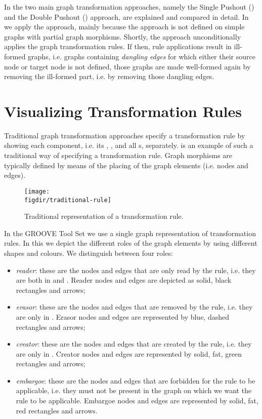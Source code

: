 In \cite{GG-Handbook-I} the two main graph transformation approaches, namely the Single Pushout (\spo) and the Double Pushout (\dpo) approach, are explained and compared in detail. In \GROOVE we apply the \spo approach, mainly because the \dpo approach is not defined on simple graphs with partial graph morphisms. Shortly, the \spo approach unconditionally applies the graph transformation rules. If then, rule applications result in ill-formed graphs, i.e. graphs containing {\em dangling edges} for which either their source node or target node is not defined, those graphs are made well-formed again by removing the ill-formed part, i.e. by removing those dangling edges.

\section{Visualizing Transformation Rules}

Traditional graph transformation approaches specify a transformation rule by showing each component, i.e. its \lhs, \rhs, and all {\nac}s, separately.  is an example of such a traditional way of specifying a transformation rule. Graph morphisms are typically defined by means of the placing of the graph elements (i.e. nodes and edges).

\begin{figure}[htp]
  \centering
  \texttt{[image: \\figdir/traditional-rule]}
  \caption{Traditional representation of a transformation rule.}
\end{figure}

In the GROOVE Tool Set we use a single graph representation of transformation rules. In this we depict the different roles of the graph elements by using different shapes and colours. We distinguish between four roles:

\begin{itemize}
  \item{{\em reader}: these are the nodes and edges that are only read by the rule, i.e. they are both in \lhs and \rhs. Reader nodes and edges are depicted as solid, black rectangles and arrows;}
  \item{{\em erasor}: these are the nodes and edges that are removed by the rule, i.e. they are only in \lhs. Erasor nodes and edges are represented by blue, dashed rectangles and arrows;}
  \item{{\em creator}: these are the nodes and edges that are created by the rule, i.e. they are only in \rhs. Creator nodes and edges are represented by solid, fat, green rectangles and arrows;}
  \item{{\em embargoe}: these are the nodes and edges that are forbidden for the rule to be applicable, i.e. they must not be present in the graph on which we want the rule to be applicable. Embargoe nodes and edges are represented by solid, fat, red rectangles and arrows.}
\end{itemize}

